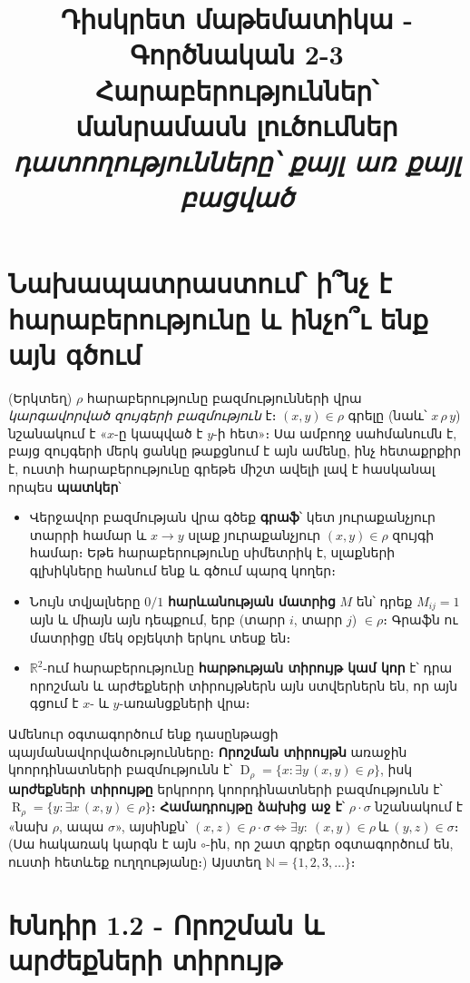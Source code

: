 \documentclass[11pt,a4paper]{article}
\title{\vspace{-1.2cm}\textbf{Դիսկրետ մաթեմատիկա - Գործնական 2-3}\\[2pt]
\large Հարաբերություններ՝ մանրամասն լուծումներ\\[2pt]
\normalsize\itshape դատողությունները՝ քայլ առ քայլ բացված}
\author{}
\date{}
\newcommand{\R}{\mathbb{R}}
\newcommand{\N}{\mathbb{N}}
\DeclareMathOperator{\Dom}{D}
\DeclareMathOperator{\Ran}{R}
\begin{document}
\maketitle
\vspace{-1.0cm}

\section*{Նախապատրաստում՝ ի՞նչ է հարաբերությունը և ինչո՞ւ ենք այն գծում}

(Երկտեղ) $\rho$ հարաբերությունը բազմությունների վրա \emph{կարգավորված զույգերի բազմություն}
է։ $(x,y)\in\rho$ գրելը (նաև՝ $x\,\rho\,y$) նշանակում է «$x$-ը կապված է $y$-ի հետ»։ Սա ամբողջ
սահմանումն է, բայց զույգերի մերկ ցանկը թաքցնում է այն ամենը, ինչ հետաքրքիր է, ուստի հարաբերությունը գրեթե միշտ
ավելի լավ է հասկանալ որպես \textbf{պատկեր}՝

\begin{itemize}[leftmargin=1.4em,itemsep=2pt,topsep=2pt]
\item Վերջավոր բազմության վրա գծեք \textbf{գրաֆ}՝ կետ յուրաքանչյուր տարրի համար և $x\to y$ սլաք
  յուրաքանչյուր $(x,y)\in\rho$ զույգի համար։ Եթե հարաբերությունը սիմետրիկ է, սլաքների գլխիկները հանում
  ենք և գծում պարզ կողեր։
\item Նույն տվյալները $0/1$ \textbf{հարևանության մատրից} $M$ են՝ դրեք $M_{ij}=1$ այն և միայն այն դեպքում, երբ
  (տարր $i$, տարր $j$) $\in\rho$։ Գրաֆն ու մատրիցը մեկ օբյեկտի երկու տեսք են։
\item $\R^2$-ում հարաբերությունը \textbf{հարթության տիրույթ կամ կոր} է՝ դրա որոշման և արժեքների
  տիրույթներն այն ստվերներն են, որ այն գցում է $x$- և $y$-առանցքների վրա։
\end{itemize}

Ամենուր օգտագործում ենք դասընթացի պայմանավորվածությունները։ \textbf{Որոշման տիրույթն} առաջին
կոորդինատների բազմությունն է՝ $\Dom_\rho=\{x:\exists y\,(x,y)\in\rho\}$, իսկ \textbf{արժեքների
տիրույթը} երկրորդ կոորդինատների բազմությունն է՝ $\Ran_\rho=\{y:\exists x\,(x,y)\in\rho\}$։
\textbf{Համադրույթը ձախից աջ է}՝ $\rho\cdot\sigma$ նշանակում է «նախ $\rho$, ապա $\sigma$», այսինքն՝
$(x,z)\in\rho\cdot\sigma \iff \exists y:\ (x,y)\in\rho\ \text{և}\ (y,z)\in\sigma$։ (Սա հակառակ կարգն է
այն $\circ$-ին, որ շատ գրքեր օգտագործում են, ուստի հետևեք ուղղությանը։) Այստեղ $\N=\{1,2,3,\dots\}$։

\section*{Խնդիր 1.2 - Որոշման և արժեքների տիրույթ}
\end{document}
